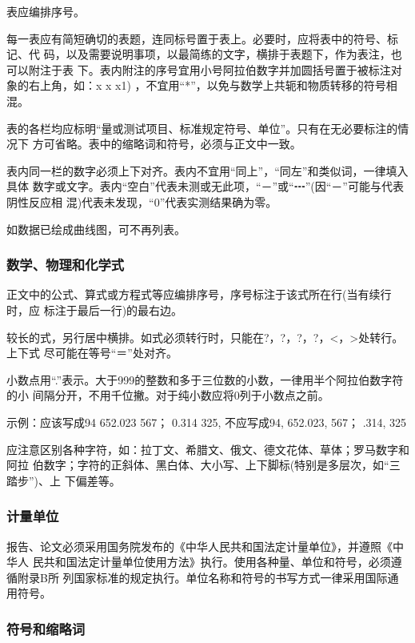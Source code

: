 \documentclass[oneside, phd]{njuthesis}
\begin{document}
表应编排序号。

每一表应有简短确切的表题，连同标号置于表上。必要时，应将表中的符号、标记、代
码，以及需要说明事项，以最简练的文字，横排于表题下，作为表注，也可以附注于表
下。表内附注的序号宜用小号阿拉伯数字并加圆括号置于被标注对象的右上角，如：x
 x x1) ，不宜用“*”，以免与数学上共轭和物质转移的符号相混。

表的各栏均应标明“量或测试项目、标准规定符号、单位”。只有在无必要标注的情况下
方可省略。表中的缩略词和符号，必须与正文中一致。

表内同一栏的数字必须上下对齐。表内不宜用“同上”，“同左”和类似词，一律填入具体
数字或文字。表内“空白”代表未测或无此项，“－”或“┅”(因“－”可能与代表阴性反应相
混)代表未发现，“0”代表实测结果确为零。

如数据已绘成曲线图，可不再列表。

\subsubsection{数学、物理和化学式}

正文中的公式、算式或方程式等应编排序号，序号标注于该式所在行(当有续行时，应
标注于最后一行)的最右边。

较长的式，另行居中横排。如式必须转行时，只能在?，?，?，?，<，>处转行。上下式
尽可能在等号“＝”处对齐。

小数点用“.”表示。大于999的整数和多于三位数的小数，一律用半个阿拉伯数字符的小
间隔分开，不用千位撇。对于纯小数应将0列于小数点之前。

示例：应该写成94 652.023 567；  0.314 325,  不应写成94, 652.023, 567；
   .314, 325

应注意区别各种字符，如：拉丁文、希腊文、俄文、德文花体、草体；罗马数字和阿拉
伯数字；字符的正斜体、黑白体、大小写、上下脚标(特别是多层次，如“三踏步”)、上
下偏差等。

\subsubsection{计量单位}

报告、论文必须采用国务院发布的《中华人民共和国法定计量单位》，并遵照《中华人
民共和国法定计量单位使用方法》执行。使用各种量、单位和符号，必须遵循附录B所
列国家标准的规定执行。单位名称和符号的书写方式一律采用国际通用符号。

\subsubsection{符号和缩略词}
\end{document}
